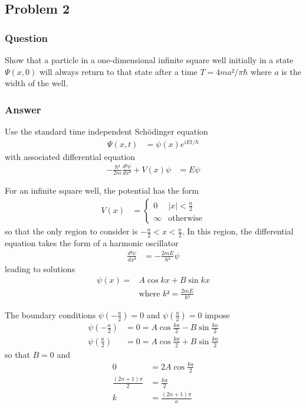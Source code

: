 \subsection{Problem 2}
\subsubsection{Question}

Show that a particle in a one-dimensional infinite square well initially in a
state $Ψ(x,0)$ will always return to that state after a time $T = 4ma²/π\hbar$
where $a$ is the width of the well.

\subsubsection{Answer}
Use the standard time independent Schödinger equation
\begin{align*}
	Ψ(x,t) &= ψ(x) e^{iEt/\hbar}
\end{align*}
with associated differential equation
\begin{align*}
	-\frac{\hbar²}{2m} \frac{d²ψ}{dx²} + V(x)ψ &= Eψ
\end{align*}

For an infinite square well, the potential has the form
\begin{align*}
	V(x) &=
		\begin{cases}
			0	&	|x| < \frac{a}{2} \\
			∞	&	\text{otherwise}
		\end{cases}
\end{align*}
so that the only region to consider is $-\frac{a}{2} < x < \frac{a}{2}$. In this
region, the differential equation takes the form of a harmonic oscillator
\begin{align*}
	\frac{d²ψ}{dx²} &= -\frac{2mE}{\hbar²}ψ
\end{align*}
leading to solutions
\begin{align*}
	ψ(x) ={}& A\cos kx + B\sin kx \\
	{}& \text{where } k² = \frac{2mE}{\hbar²}
\end{align*}

The boundary conditions $ψ(-\frac{a}{2}) = 0$ and $ψ(\frac{a}{2}) = 0$ impose
\begin{align*}
	ψ\left(-\frac{a}{2}\right) &= 0 = A\cos \frac{ka}{2} - B\sin \frac{ka}{2} \\
	ψ\left(\frac{a}{2}\right)  &= 0 = A\cos \frac{ka}{2} + B\sin \frac{ka}{2}
\end{align*}
so that $B = 0$ and
\begin{align*}
	0 &= 2A \cos \frac{ka}{2} \\
	\frac{(2n+1)π}{2} &= \frac{ka}{2} \\
	k &= \frac{(2n+1)π}{a}
\end{align*}

